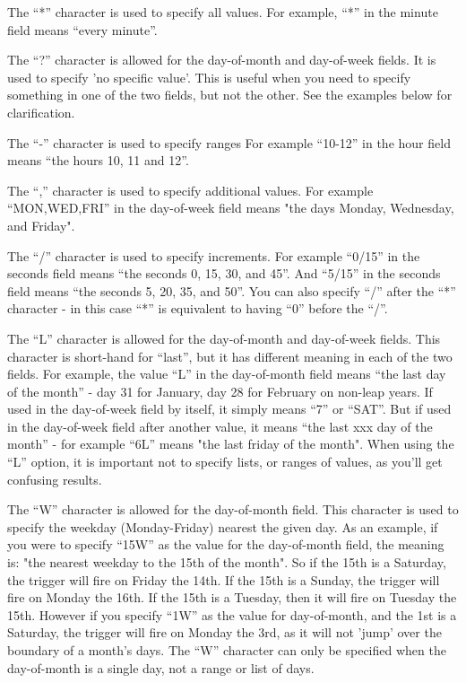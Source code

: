 \documentclass{InsightBook}
\begin{document}
The ``*'' character is used to specify all values. For example, ``*'' in
the minute field means ``every minute''.

The ``?'' character is allowed for the day-of-month and day-of-week
fields. It is used to specify 'no specific value'. This is useful when
you need to specify something in one of the two fields, but not the
other. See the examples below for clarification.

The ``-'' character is used to specify ranges For example ``10-12'' in the
hour field means ``the hours 10, 11 and 12''.

The ``,'' character is used to specify additional values. For example
``MON,WED,FRI'' in the day-of-week field means "the days Monday,
Wednesday, and Friday".

The ``/'' character is used to specify increments. For example ``0/15'' in
the seconds field means ``the seconds 0, 15, 30, and 45''. And ``5/15'' in
the seconds field means ``the seconds 5, 20, 35, and 50''. You can also
specify ``/'' after the ``*'' character - in this case ``*'' is equivalent
to having ``0'' before the ``/''.

The ``L'' character is allowed for the day-of-month and day-of-week
fields. This character is short-hand for ``last'', but it has different
meaning in each of the two fields. For example, the value ``L'' in the
day-of-month field means ``the last day of the month'' - day 31 for
January, day 28 for February on non-leap years. If used in the
day-of-week field by itself, it simply means ``7'' or ``SAT''. But if used
in the day-of-week field after another value, it means ``the last xxx
day of the month'' - for example ``6L'' means "the last friday of the
month". When using the ``L'' option, it is important not to specify
lists, or ranges of values, as you'll get confusing results.

The ``W'' character is allowed for the day-of-month field. This
character is used to specify the weekday (Monday-Friday) nearest the
given day. As an example, if you were to specify ``15W'' as the value
for the day-of-month field, the meaning is: "the nearest weekday to
the 15th of the month". So if the 15th is a Saturday, the trigger will
fire on Friday the 14th. If the 15th is a Sunday, the trigger will
fire on Monday the 16th. If the 15th is a Tuesday, then it will fire
on Tuesday the 15th. However if you specify ``1W'' as the value for
day-of-month, and the 1st is a Saturday, the trigger will fire on
Monday the 3rd, as it will not 'jump' over the boundary of a month's
days. The ``W'' character can only be specified when the day-of-month is
a single day, not a range or list of days.
\end{document}
